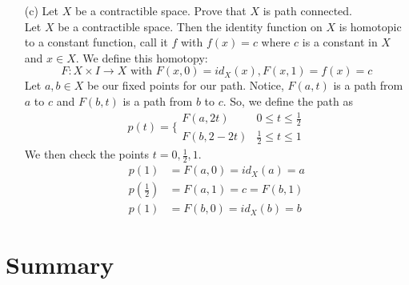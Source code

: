 \documentclass[12pt]{article}
\begin{document}
\begin{enumerate}
\begin{enumerate}
			\item[(c)] Let $X$ be a contractible space. Prove that $X$ is path connected.\\
			Let $ X $ be a contractible space. Then the identity function on $ X $ is homotopic to a constant function, call it $ f $ with $ f(x)=c $ where $ c $ is a constant in $ X $ and $ x\in X $. We define this homotopy:
				\[F:X\times I \rightarrow X \text{ with } F(x,0)=id_X(x),F(x,1)=f(x)=c\]
			Let $ a,b \in X$ be our fixed points for our path. Notice, $ F(a,t) $ is a path from $ a $ to $ c $ and $ F(b,t) $ is a path from $ b $ to $ c $. So, we define the path as
			\[p(t) = \{\begin{array}{ll}
				{F(a,2t)} & {0 \leq t \leq \frac{1}{2}} \\
				{F(b,2-2t)} & {\frac{1}{2} \leq t \leq 1}
			\end{array}\]
			We then check the points $ t=0,\frac{1}{2},1 $.
			\begin{align*}
				p(1)&=F(a,0)=id_X(a)=a\\
				p(\frac{1}{2})&=F(a,1)=c=F(b,1)\\
				p(1)&=F(b,0)=id_X(b)=b
			\end{align*}
		\end{enumerate}
		
	\end{enumerate}
	\section*{Summary}
	
\end{document}
